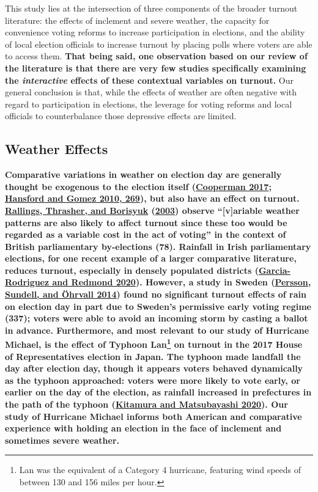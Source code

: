 \documentclass[
  12pt,
]{article}
\begin{document}
This study lies at the intersection of three components of the broader turnout literature: the effects of inclement and severe weather, the capacity for convenience voting reforms to increase participation in elections, and the ability of local election officials to increase turnout by placing polls where voters are able to access them. \textbf{That being said, one observation based on our review of the literature is that there are very few studies specifically examining the \emph{interactive} effects of these contextual variables on turnout.} Our general conclusion is that, while the effects of weather are often negative with regard to participation in elections, the leverage for voting reforms and local officials to counterbalance those depressive effects are limited.

\hypertarget{weather-effects}{%
\subsection*{Weather Effects}\label{weather-effects}}

\textbf{Comparative variations in weather on election day are generally thought be exogenous to the election itself (\protect\hyperlink{ref-Cooperman2017}{Cooperman 2017}; \protect\hyperlink{ref-Hansford2010}{Hansford and Gomez 2010, 269}), but also have an effect on turnout. \protect\hyperlink{ref-Rallings2003}{Rallings, Thrasher, and Borisyuk} (\protect\hyperlink{ref-Rallings2003}{2003}) observe ``{[}v{]}ariable weather patterns are also likely to affect turnout since these too would be regarded as a variable cost in the act of voting'' in the context of British parliamentary by-elections (78). Rainfall in Irish parliamentary elections, for one recent example of a larger comparative literature, reduces turnout, especially in densely populated districts (\protect\hyperlink{ref-Garcia-Rodriguez2020}{Garcia-Rodriguez and Redmond 2020}). However, a study in Sweden (\protect\hyperlink{ref-Persson2014}{Persson, Sundell, and Öhrvall 2014}) found no significant turnout effects of rain on election day in part due to Sweden's permissive early voting regime (337); voters were able to avoid an incoming storm by casting a ballot in advance. Furthermore, and most relevant to our study of Hurricane Michael, is the effect of Typhoon Lan\footnote{Lan was the equivalent of a Category 4 hurricane, featuring wind speeds of between 130 and 156 miles per hour.} on turnout in the 2017 House of Representatives election in Japan. The typhoon made landfall the day after election day, though it appears voters behaved dynamically as the typhoon approached: voters were more likely to vote early, or earlier on the day of the election, as rainfall increased in prefectures in the path of the typhoon (\protect\hyperlink{ref-Kitamura2020}{Kitamura and Matsubayashi 2020}). Our study of Hurricane Michael informs both American and comparative experience with holding an election in the face of inclement and sometimes severe weather.}
\end{document}
